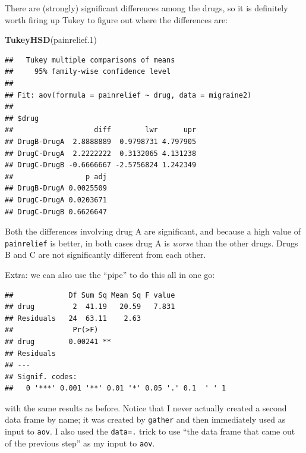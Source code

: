 \documentclass[]{tufte-book}
\newenvironment{Shaded}{}{}
\newcommand{\DataTypeTok}[1]{\textcolor[rgb]{0.56,0.13,0.00}{#1}}
\newcommand{\FloatTok}[1]{\textcolor[rgb]{0.25,0.63,0.44}{#1}}
\newcommand{\KeywordTok}[1]{\textcolor[rgb]{0.00,0.44,0.13}{\textbf{#1}}}
\newcommand{\NormalTok}[1]{#1}
\newcommand{\OperatorTok}[1]{\textcolor[rgb]{0.40,0.40,0.40}{#1}}
\newcommand{\StringTok}[1]{\textcolor[rgb]{0.25,0.44,0.63}{#1}}
\theoremstyle{definition}
\theoremstyle{definition}
\theoremstyle{definition}
\theoremstyle{remark}
\begin{document}
There are (strongly) significant differences among the drugs, so it is
definitely worth firing up Tukey to figure out where the differences
are:

\begin{Shaded}
\begin{Highlighting}[]
\KeywordTok{TukeyHSD}\NormalTok{(painrelief}\FloatTok{.1}\NormalTok{)}
\end{Highlighting}
\end{Shaded}

\begin{verbatim}
##   Tukey multiple comparisons of means
##     95% family-wise confidence level
## 
## Fit: aov(formula = painrelief ~ drug, data = migraine2)
## 
## $drug
##                   diff        lwr      upr
## DrugB-DrugA  2.8888889  0.9798731 4.797905
## DrugC-DrugA  2.2222222  0.3132065 4.131238
## DrugC-DrugB -0.6666667 -2.5756824 1.242349
##                 p adj
## DrugB-DrugA 0.0025509
## DrugC-DrugA 0.0203671
## DrugC-DrugB 0.6626647
\end{verbatim}

Both the differences involving drug A are significant, and because a
high value of \texttt{painrelief} is better, in both cases drug A is
\emph{worse} than the other drugs. Drugs B and C are not significantly
different from each other.

Extra: we can also use the ``pipe'' to do this all in one go:

\begin{Shaded}
\end{Shaded}

\begin{verbatim}
##             Df Sum Sq Mean Sq F value
## drug         2  41.19   20.59   7.831
## Residuals   24  63.11    2.63        
##              Pr(>F)   
## drug        0.00241 **
## Residuals             
## ---
## Signif. codes:  
##   0 '***' 0.001 '**' 0.01 '*' 0.05 '.' 0.1  ' ' 1
\end{verbatim}

with the same results as before. Notice that I never actually created a
second data frame by name; it was created by \texttt{gather} and then
immediately used as input to \texttt{aov}.
 I also used the \texttt{data=.} trick
to use ``the data frame that came out of the previous step'' as my input
to \texttt{aov}.
\end{document}
